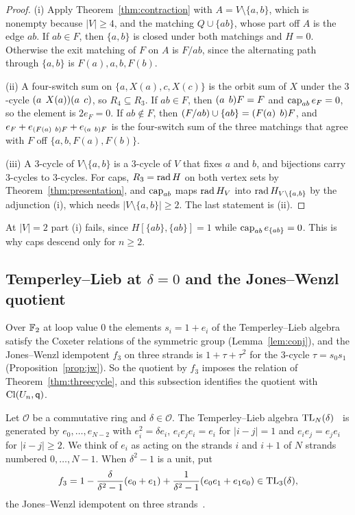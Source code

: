 \begin{proof}
(i) Apply Theorem~\ref{thm:contraction} with $A=V\setminus\{a,b\}$, which is nonempty because $|V|\ge4$, and the matching $Q\cup\{ab\}$, whose part off $A$ is the edge $ab$. If $ab\in F$, then $\{a,b\}$ is closed under both matchings and $H=0$. Otherwise the exit matching of $F$ on $A$ is $F/ab$, since the alternating path through $\{a,b\}$ is $F(a),a,b,F(b)$.

(ii) A four-switch sum on $\{a,X(a),c,X(c)\}$ is the orbit sum of $X$ under the $3$-cycle $(a\;\,X(a))(a\;\,c)$, so $R_4\subseteq R_3$. If $ab\in F$, then $(a\;\,b)F=F$ and $\operatorname{cap}_{ab}e_F=0$, so the element is $2e_F=0$. If $ab\notin F$, then $(F/ab)\cup\{ab\}=(F(a)\;\,b)F$, and $e_F+e_{(F(a)\;\,b)F}+e_{(a\;\,b)F}$ is the four-switch sum of the three matchings that agree with $F$ off $\{a,b,F(a),F(b)\}$.

(iii) A $3$-cycle of $V\setminus\{a,b\}$ is a $3$-cycle of $V$ that fixes $a$ and $b$, and bijections carry $3$-cycles to $3$-cycles. For caps, $R_3=\operatorname{rad} H$ on both vertex sets by Theorem~\ref{thm:presentation}, and $\operatorname{cap}_{ab}$ maps $\operatorname{rad} H_V$ into $\operatorname{rad} H_{V\setminus\{a,b\}}$ by the adjunction (i), which needs $|V\setminus\{a,b\}|\ge2$. The last statement is (ii).
\end{proof}

\begin{remark}\label{rem:boundary}
At $|V|=2$ part (i) fails, since $H[\{ab\},\{ab\}]=1$ while $\operatorname{cap}_{ab}e_{\{ab\}}=0$. This is why caps descend only for $n\ge2$.
\end{remark}

\subsection{Temperley--Lieb at \texorpdfstring{$\delta=0$}{delta=0} and the Jones--Wenzl quotient}\label{subsec:tl} %

Over $\mathbb{F}_2$ at loop value $0$ the elements $s_i=1+e_i$ of the Temperley--Lieb algebra satisfy the Coxeter relations of the symmetric group (Lemma~\ref{lem:conj}), and the Jones--Wenzl idempotent $f_3$ on three strands is $1+\tau+\tau^2$ for the $3$-cycle $\tau=s_{0}s_1$ (Proposition~\ref{prop:jw}). So the quotient by $f_3$ imposes the relation of Theorem~\ref{thm:threecycle}, and this subsection identifies the quotient with $\operatorname{Cl}(U_n,\mathsf{q})$. %

Let $\mathcal O$ be a commutative ring and $\delta\in\mathcal O$. The Temperley--Lieb algebra $\mathrm{TL}_N(\delta)$~\cite{Jones83,TL71} is generated by $e_0,\dots,e_{N-2}$ with $e_i^2=\delta e_i$, $e_{i}e_{j}e_i=e_i$ for $|i-j|=1$ and $e_{i}e_j=e_{j}e_i$ for $|i-j|\ge2$. We think of $e_i$ as acting on the strands $i$ and $i+1$ of $N$ strands numbered $0,\dots,N-1$. When $\delta^2-1$ is a unit, put %
\[
f_3=1-\frac{\delta}{\delta^2-1}(e_0+e_1)+\frac{1}{\delta^2-1}(e_{0}e_1+e_{1}e_0)\in\mathrm{TL}_3(\delta),
\]
the Jones--Wenzl idempotent on three strands~\cite{Wenzl87}. %


